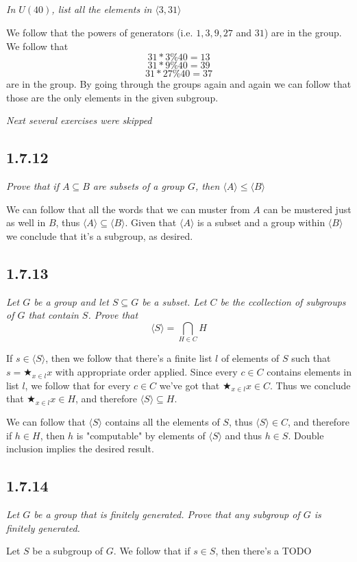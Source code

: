 \documentclass[11pt,oneside,titlepage]{book}
\newcommand{\eangle}[1]{\langle #1 \rangle}
\begin{document}
\subsection{}

\textit{In $U(40)$, list all the elements in $\eangle{3, 31}$}

We follow that the powers of generators (i.e. $1, 3, 9, 27$ and $31$) are in the group.
We follow that
$$31 * 3 \% 40 = 13$$
$$31 * 9 \% 40 = 39$$
$$31 * 27 \% 40 = 37$$
are in the group. By going through the groups again and again we can follow that those are the only
elements in the given subgroup.

\textit{Next several exercises were skipped}

\subsection*{1.7.12}

\textit{Prove that if $A \subseteq B$ are subsets of a group $G$, then $\eangle{A} \leq \eangle{B}$}

We can follow that all the words that we can muster from $A$ can be mustered just as well in $B$,
thus $\eangle{A} \subseteq \eangle{B}$. Given that $\eangle{A}$ is a subset and a group
within $\eangle{B}$ we conclude that it's a subgroup, as desired.

\subsection*{1.7.13}

\textit{Let $G$ be a group and let $S \subseteq G$ be a subset. Let $C$ be the ccollection
  of subgroups of $G$ that contain $S$. Prove that
  $$\eangle{S} = \bigcap_{H \in C}H$$}

If $s \in \eangle{S}$, then we follow that there's a finite list $l$ of elements of
$S$ such that $s = \bigstar_{x \in l}{x}$ with appropriate order applied. Since every
$c \in C$ contains elements in list $l$, we follow that for every $c \in C$ we've got that
$\bigstar_{x \in l}{x} \in C$. Thus we conclude that $\bigstar_{x \in l}{x} \in H$, and therefore
$\eangle{S} \subseteq H$.

We can follow that $\eangle{S}$ contains all the elements of $S$, thus $\eangle{S} \in C$, and
therefore if $h \in H$, then $h$ is "computable" by elements of $\eangle{S}$ and thus $h \in S$.
Double inclusion implies the desired result.

\subsection*{1.7.14}

\textit{Let $G$ be a group that is finitely generated. Prove that any subgroup of $G$ is finitely
  generated.}

Let $S$ be a subgroup of $G$. We follow that if $s \in S$, then there's a TODO
\end{document}
